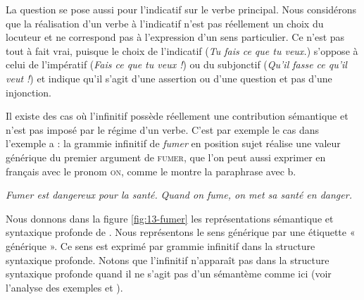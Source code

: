 La question se pose aussi pour l’indicatif sur le verbe principal. Nous considérons que la réalisation d’un verbe à l’indicatif n’est pas réellement un choix du locuteur et ne correspond pas à l’expression d’un sens particulier. Ce n’est pas tout à fait vrai, puisque le choix de l’indicatif (\textit{Tu fais ce que tu veux.}) s’oppose à celui de l’impératif (\textit{Fais ce que tu veux !}) ou du subjonctif (\textit{Qu’il fasse ce qu’il veut !}) et indique qu’il s’agit d’une assertion ou d’une question et pas d’une injonction.

Il existe des cas où l’infinitif possède réellement une contribution sémantique et n’est pas imposé par le régime d’un verbe. C’est par exemple le cas dans l’exemple a : la grammie infinitif de \textit{fumer} en position sujet réalise une valeur générique du premier argument de \textsc{fumer}, que l’on peut aussi exprimer en français avec le pronom \textsc{on}, comme le montre la paraphrase avec b. 

\ea\label{ex:13-fumer}
\ea \textit{Fumer est dangereux pour la santé.}
\ex \textit{Quand on fume, on met sa santé en danger.}\z\z

Nous donnons dans la figure \ref{fig:13-fumer} les représentations sémantique et syntaxique profonde de . Nous représentons le sens générique par une étiquette « générique ». Ce sens est exprimé par grammie infinitif dans la structure syntaxique profonde. Notons que l’infinitif n’apparaît pas dans la structure syntaxique profonde quand il ne s’agit pas d’un sémantème comme ici (voir l’analyse des exemples  et ).

